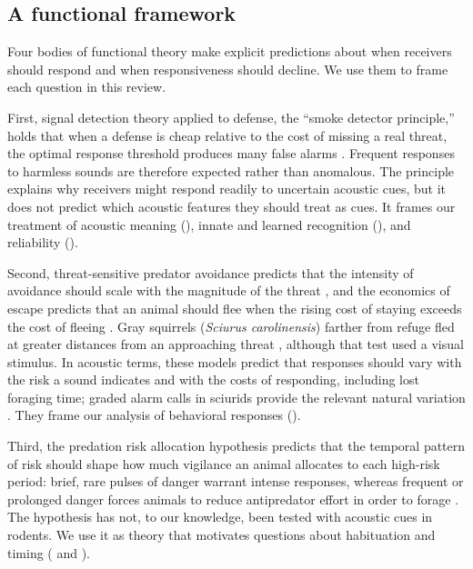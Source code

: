 \subsection{A functional framework}
\label{sec:intro-framework}

Four bodies of functional theory make explicit predictions about when receivers should respond and when responsiveness should decline. We use them to frame each question in this review.

First, signal detection theory applied to defense, the ``smoke detector principle,'' holds that when a defense is cheap relative to the cost of missing a real threat, the optimal response threshold produces many false alarms \citep{Nesse2005}. Frequent responses to harmless sounds are therefore expected rather than anomalous. The principle explains why receivers might respond readily to uncertain acoustic cues, but it does not predict which acoustic features they should treat as cues. It frames our treatment of acoustic meaning (), innate and learned recognition (), and reliability ().

Second, threat-sensitive predator avoidance predicts that the intensity of avoidance should scale with the magnitude of the threat \citep{Helfman1989}, and the economics of escape predicts that an animal should flee when the rising cost of staying exceeds the cost of fleeing \citep{YdenbergDill1986}. Gray squirrels (\textit{Sciurus carolinensis}) farther from refuge fled at greater distances from an approaching threat \citep{DillHoutman1989}, although that test used a visual stimulus. In acoustic terms, these models predict that responses should vary with the risk a sound indicates and with the costs of responding, including lost foraging time; graded alarm calls in sciurids provide the relevant natural variation \citep{BlumsteinArmitage1997,SloanEtAl2005}. They frame our analysis of behavioral responses ().

Third, the predation risk allocation hypothesis predicts that the temporal pattern of risk should shape how much vigilance an animal allocates to each high-risk period: brief, rare pulses of danger warrant intense responses, whereas frequent or prolonged danger forces animals to reduce antipredator effort in order to forage \citep{LimaBednekoff1999}. The hypothesis has not, to our knowledge, been tested with acoustic cues in rodents. We use it as theory that motivates questions about habituation and timing ( and ).

